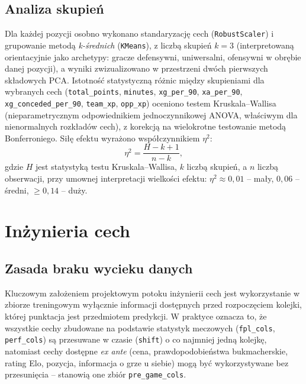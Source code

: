 \documentclass[a4paper,twoside,11pt]{mwrep}
\theoremstyle{plain} \newtheorem{thm}{Twierdzenie}
\theoremstyle{plain} \newtheorem{lem}{Lemat}
\theoremstyle{definition} \newtheorem{defn}{Definicja}
\theoremstyle{remark} \newtheorem*{rem}{Wniosek}
\begin{document}
\section{Analiza skupień}

Dla każdej pozycji osobno wykonano standaryzację cech (\texttt{RobustScaler})
i grupowanie metodą \emph{k-średnich} (\texttt{KMeans}), z liczbą skupień
$k=3$ (interpretowaną orientacyjnie jako archetypy: gracze defensywni,
uniwersalni, ofensywni w obrębie danej pozycji), a wyniki zwizualizowano w
przestrzeni dwóch pierwszych składowych PCA. Istotność statystyczną różnic
między skupieniami dla wybranych cech (\texttt{total\_points},
\texttt{minutes}, \texttt{xg\_per\_90}, \texttt{xa\_per\_90},
\texttt{xg\_conceded\_per\_90}, \texttt{team\_xp}, \texttt{opp\_xp}) oceniono
testem Kruskala–Wallisa (nieparametrycznym odpowiednikiem jednoczynnikowej
ANOVA, właściwym dla nienormalnych rozkładów cech), z korekcją na
wielokrotne testowanie metodą Bonferroniego. Siłę efektu wyrażono
współczynnikiem $\eta^2$:
\begin{equation}
    \eta^2 = \frac{H - k + 1}{n - k},
\end{equation}
gdzie $H$ jest statystyką testu Kruskala–Wallisa, $k$ liczbą skupień, a $n$
liczbą obserwacji, przy umownej interpretacji wielkości efektu:
$\eta^2 \approx 0{,}01$ -- mały, $0{,}06$ -- średni, $\geq 0{,}14$ -- duży.

\chapter{Inżynieria cech}\label{ch:features}

\section{Zasada braku wycieku danych}

Kluczowym założeniem projektowym potoku inżynierii cech jest wykorzystanie
w zbiorze treningowym wyłącznie informacji dostępnych przed rozpoczęciem
kolejki, której punktacja jest przedmiotem predykcji. W praktyce oznacza
to, że wszystkie cechy zbudowane na podstawie statystyk meczowych
(\texttt{fpl\_cols}, \texttt{perf\_cols}) są przesuwane w czasie
(\texttt{shift}) o co najmniej jedną kolejkę, natomiast cechy dostępne
\emph{ex ante} (cena, prawdopodobieństwa bukmacherskie, rating Elo,
pozycja, informacja o grze u siebie) mogą być wykorzystywane bez
przesunięcia -- stanowią one zbiór \texttt{pre\_game\_cols}.
\end{document}
